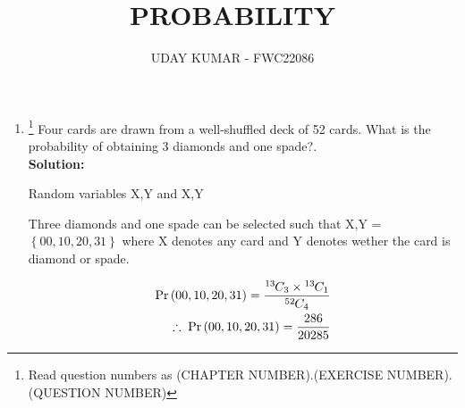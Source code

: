 \documentclass{article}
\providecommand{\cbrak}[1]{\ensuremath{\left\{#1\right\}}}
\newcommand{\solution}{\noindent \textbf{Solution: }}
\providecommand{\pr}[1]{\ensuremath{\Pr\left(#1\right)}}
\newcommand*{\permcomb}[4][0mu]{{{}^{#3}\mkern#1#2_{#4}}}
\newcommand*{\comb}[1][-1mu]{\permcomb[#1]{C}}
\begin{document}
\title{PROBABILITY}
\author{\Large UDAY KUMAR - FWC22086}
\date{}

\maketitle

\begin{enumerate}[label=16.\arabic{enumi}.\arabic{enumii}]%
\setcounter{enumi}{3}
\setcounter{enumii}{2}

\item \footnote{Read question numbers as (CHAPTER NUMBER).(EXERCISE NUMBER).(QUESTION NUMBER)} {Four cards are drawn from a well-shuffled deck of 52 cards. What is the probability of obtaining 3 diamonds and one spade?.}\\[1ex]
	\solution\\
	
\begin{table}[h]
	
	\caption{Random variables X,Y and X,Y}\label{table1:}
\end{table}

		 Three diamonds and one spade can be selected such that  X,Y = $\cbrak{00,10,20,31}$ where X denotes any card   and Y denotes wether the card is diamond or spade.
 
	\begin{align}
	   \pr{00,10,20,31} =\frac{\comb{13}{3} \times \comb{13}{1}}{\comb{52}{4}}\\ 
\therefore \;\pr{00,10,20,31} = \frac{286}{20285}
\end{align}
\end{enumerate}
\end{document}

